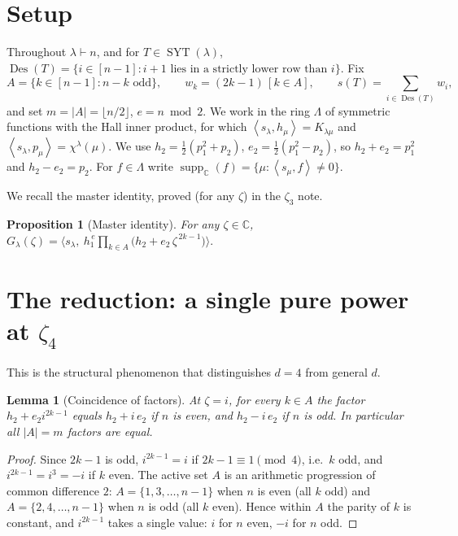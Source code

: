 \documentclass[11pt]{article}
\newtheorem{lemma}{Lemma}
\newtheorem{proposition}{Proposition}
\theoremstyle{definition}
\theoremstyle{remark}
\DeclareMathOperator{\Des}{Des}
\DeclareMathOperator{\SYT}{SYT}
\DeclareMathOperator{\supp}{supp}
\newcommand{\CC}{\mathbb{C}}
\newcommand{\la}{\lambda}
\newcommand{\inner}[1]{\left\langle #1 \right\rangle}
\begin{document}
\section{Setup}

Throughout $\la\vdash n$, and for $T\in\SYT(\la)$,
$\Des(T)=\{i\in[n-1]:i{+}1\text{ lies in a strictly lower row than }i\}$. Fix
\[
  A=\{k\in[n-1]:n-k\text{ odd}\},\qquad w_k=(2k-1)\,[k\in A],\qquad
  s(T)=\sum_{i\in\Des(T)}w_i,
\]
and set $m=|A|=\lfloor n/2\rfloor$, $e=n\bmod2$. We work in the ring $\Lambda$ of
symmetric functions with the Hall inner product, for which
$\inner{s_\la,h_\mu}=K_{\la\mu}$ and $\inner{s_\la,p_\mu}=\chi^\la(\mu)$. We use
$h_2=\tfrac12(p_1^2+p_2)$, $e_2=\tfrac12(p_1^2-p_2)$, so $h_2+e_2=p_1^2$ and
$h_2-e_2=p_2$. For $f\in\Lambda$ write $\supp_\CC(f)=\{\mu:\inner{s_\mu,f}\neq0\}$.

We recall the master identity, proved (for any $\zeta$) in the $\zeta_3$ note.

\begin{proposition}[Master identity]\label{prop:master}
For any $\zeta\in\CC$,
$\displaystyle
  G_\la(\zeta)=\Big\langle s_\la,\ h_1^{\,e}\prod_{k\in A}\big(h_2+e_2\,\zeta^{\,2k-1}\big)\Big\rangle .
$
\end{proposition}

\section{The reduction: a single pure power at $\zeta_4$}

This is the structural phenomenon that distinguishes $d=4$ from general $d$.

\begin{lemma}[Coincidence of factors]\label{lem:coincide}
At $\zeta=i$, for every $k\in A$ the factor $h_2+e_2 i^{2k-1}$ equals
$h_2+i\,e_2$ if $n$ is even, and $h_2-i\,e_2$ if $n$ is odd. In particular all
$|A|=m$ factors are equal.
\end{lemma}

\begin{proof}
Since $2k-1$ is odd, $i^{2k-1}=i$ if $2k-1\equiv1\pmod4$, i.e.\ $k$ odd, and
$i^{2k-1}=i^3=-i$ if $k$ even. The active set $A$ is an arithmetic progression of
common difference $2$: $A=\{1,3,\dots,n-1\}$ when $n$ is even (all $k$ odd) and
$A=\{2,4,\dots,n-1\}$ when $n$ is odd (all $k$ even). Hence within $A$ the parity
of $k$ is constant, and $i^{2k-1}$ takes a single value: $i$ for $n$ even, $-i$
for $n$ odd.
\end{proof}
\end{document}
